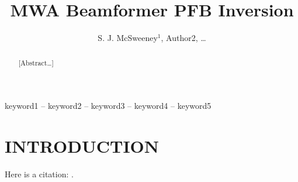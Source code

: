 \documentclass{pasa}%
\title[MWA Beamformer PFB Inversion]{MWA Beamformer PFB Inversion}
\author[McSweeney et al.]{S. J. McSweeney$^1$, Author2, \dots
\affil{$^1$CIRA, Curtin University}%
}
\begin{document}
\begin{frontmatter}
\maketitle

\begin{abstract}
[Abstract\dots]
\end{abstract}

\begin{keywords}
keyword1 -- keyword2 -- keyword3 -- keyword4 -- keyword5
\end{keywords}
\end{frontmatter}


\section{INTRODUCTION }
\label{sec:intro}

Here is a citation: \citep{Harris2011}.
\end{document}
